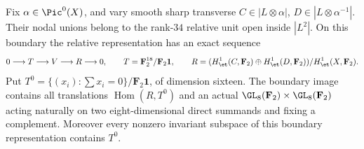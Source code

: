 \begin{lemma}
\label{lem:mixed-degree-two-boundary-group-candidate}
Fix $\alpha\in\Pic^0(X)$, and vary smooth sharp transverse
$C\in|L\otimes\alpha|$, $D\in|L\otimes\alpha^{-1}|$.
Their nodal unions belong to the rank-$34$ relative unit open
inside $|L^2|$. On this boundary the relative representation
has an exact sequence
\[
 0\longrightarrow T\longrightarrow V\longrightarrow R\longrightarrow0,
 \qquad T=\mathbf F_2^{18}/\mathbf F_2\mathbf1,
 \qquad R=(H^1_{\et}(C,\mathbf F_2)\oplus
             H^1_{\et}(D,\mathbf F_2))/H^1_{\et}(X,\mathbf F_2).
\]
Put $T^0=\{(x_i):\sum x_i=0\}/\mathbf F_2\mathbf1$,
of dimension sixteen. The boundary image contains all
translations $\operatorname{Hom}(R,T^0)$ and an actual
$\GL_8(\mathbf F_2)\times\GL_8(\mathbf F_2)$ acting naturally
on two eight-dimensional direct summands and fixing a
complement. Moreover every nonzero invariant subspace of
this boundary representation contains $T^0$.
\end{lemma}
